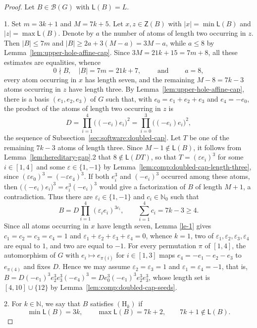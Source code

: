 \documentclass[a4paper, 10pt]{amsart}
\theoremstyle{plain}
\theoremstyle{definition}
\theoremstyle{definition}
\newcommand{\N}{\mathbb N}
\numberwithin{equation}{section}
\begin{document}
\begin{proof}
Let $B \in \mathcal B (G)$ with $\mathsf L (B)=L$.

1.  Set $m = 3k+1$ and $M = 7k+5$. Let $x, z \in \mathsf Z (B)$ with $|x|=\min \mathsf L (B)$ and $|z|=\max \mathsf L (B)$.  Denote by $a$ the number of atoms of length two occurring in $z$.  Then $|B| \le 7m$ and $|B| \ge 2a+3(M-a) = 3M-a$, while
$a \le 8$ by Lemma~\ref{lem:upper-hole-affine-cap}. Since
$3M = 21k+15 = 7m+8$, all these estimates are equalities, whence 
\[
0\nmid B,\quad |B| = 7m = 21k+7,
 \qquad \text{ and }\qquad a = 8,
\]
every atom occurring in $x$ has length seven, and the remaining $M-8 = 7k-3$
atoms occurring in $z$ have length three.  By 
Lemma~\ref{lem:upper-hole-affine-cap}, there is a basis $(e_1,e_2,e_3)$ of
$G$ such that, with $e_0 = e_1+e_2+e_3$ and $e_4 = -e_0$, the product of the
atoms of length two occurring in $z$ is
\[
D = \prod_{i=1}^{4}\bigl((-e_i)e_i\bigr)^2 = \prod_{i=0}^{3}\bigl((-e_i)e_i\bigr)^2 ,
\]
the sequence of Subsection~\ref{sec:software:doubled-cap}.
Let $T$ be one of the remaining $7k-3$ atoms of length three.  Since
$M - 1 \notin \mathsf L (B)$, it follows from  Lemma~\ref{lem:hereditary-gap}.2 that 
$8 \notin \mathsf L (DT)$, so that $T = (\varepsilon e_i)^3$ for some
$i \in [1,4]$ and some $\varepsilon \in \{1,-1\}$ by
Lemma~\ref{lem:comp:doubled-cap-length-three}, since $(\varepsilon e_0)^3 = (-\varepsilon e_4)^3$.  If both $e_i^3$ and
$(-e_i)^3$ occurred among these atoms, then $\bigl((-e_i)e_i\bigr)^3 = e_i^3(-e_i)^3$ would give a factorization of $B$ of length $M+1$, a contradiction.
Thus there are
$\varepsilon_i \in \{1,-1\}$ and $c_i \in \N_0$ such that
\[
 B = D\prod_{i=1}^{4}(\varepsilon_i e_i)^{3c_i},
 \qquad \sum_{i=1}^{4}c_i = 7k-3\ge 4.
\]
Since all atoms occurring in $x$ have length seven, Lemma \ref{le-1} gives $c_1=c_2=c_3=c_4=1$ and $\varepsilon_1+\varepsilon_2+\varepsilon_3+\varepsilon_4=0$, whence
$k=1$,   two of $\varepsilon_1,\varepsilon_2,\varepsilon_3,\varepsilon_4$
are equal to $1$, and two are equal to $-1$.  For every permutation $\pi$ of
$[1,4]$, the automorphism of $G$ with $e_i \mapsto e_{\pi (i)}$ for
$i \in [1,3]$ maps $e_4 = -e_1-e_2-e_3$ to $e_{\pi (4)}$ and fixes $D$.
Hence we may assume $\varepsilon_2=\varepsilon_3=1$ and
$\varepsilon_1=\varepsilon_4=-1$, that is, $B = D(-e_1)^3e_2^3e_3^3(-e_4)^3 = De_0^3(-e_1)^3e_2^3e_3^3$, whose length set is
$[4,10]\cup\{12\}$ by Lemma~\ref{lem:comp:doubled-cap-seeds}.

2.  For $k \in \N$, we say that $B$ satisfies $(\mathrm H_k)$ if
\[
 \min\mathsf L(B)=3k,
 \qquad \max\mathsf L(B)=7k+2,
 \qquad 7k+1\notin\mathsf L(B) .
\]



\end{proof}
\end{document}

